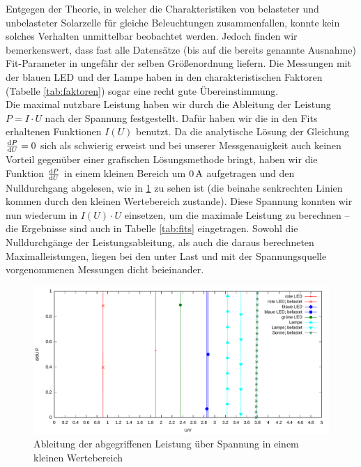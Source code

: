 \documentclass[numbers=noenddot,12pt,a4paper]{scrartcl}
\newcommand{\diff}{\textnormal{d}}
\begin{document}
Entgegen der Theorie, in welcher die Charakteristiken von belasteter und unbelasteter Solarzelle für gleiche Beleuchtungen zusammenfallen, konnte kein solches Verhalten unmittelbar beobachtet werden. Jedoch finden wir bemerkenswert, dass fast alle Datensätze (bis auf die bereits genannte Ausnahme) Fit-Parameter in ungefähr der selben Größenordnung liefern. Die Messungen mit der blauen LED und der Lampe haben in den charakteristischen Faktoren (Tabelle \ref{tab:faktoren}) sogar eine recht gute Übereinstimmung.\\
Die maximal nutzbare Leistung haben wir durch die Ableitung der Leistung $P=I\cdot U$ nach der Spannung festgestellt. Dafür haben wir die in den Fits erhaltenen Funktionen $I(U)$ benutzt. Da die analytische Lösung der Gleichung $\frac{\diff P}{\diff U}=0$ sich als schwierig erweist und bei unserer Messgenauigkeit auch keinen Vorteil gegenüber einer grafischen Lösungsmethode bringt, haben wir die Funktion $\frac{\diff P}{\diff U}$ in einem kleinen Bereich um $\unit[0]{A}$ aufgetragen und den Nulldurchgang abgelesen, wie in \ref{img:maxleistung} zu sehen ist (die beinahe senkrechten Linien kommen durch den kleinen Wertebereich zustande). Diese Spannung konnten wir nun wiederum in $I(U)\cdot U$ einsetzen, um die maximale Leistung zu berechnen -- die Ergebnisse sind auch in Tabelle \ref{tab:fits} eingetragen. Sowohl die Nulldurchgänge der Leistungsableitung, als auch die daraus berechneten Maximalleistungen, liegen bei den unter Last und mit der Spannungsquelle vorgenommenen Messungen dicht beieinander.
\begin{figure}[H]
	\includegraphics[width=\textwidth]{messwerte/leistungsmaxima.pdf}
	\caption{Ableitung der abgegriffenen Leistung über Spannung in einem kleinen Wertebereich}
	\label{img:maxleistung}
\end{figure}
\end{document}
